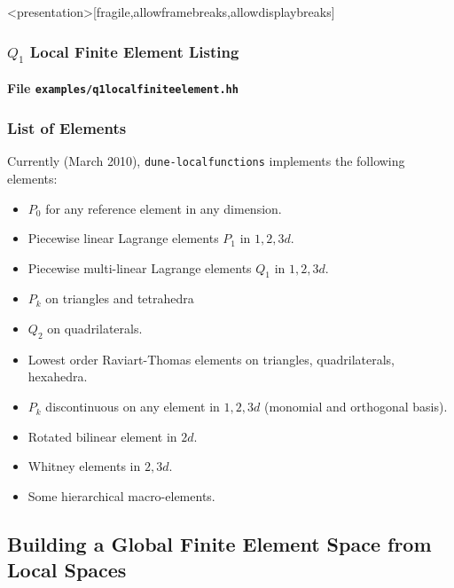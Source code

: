 \begin{frame}<presentation>[fragile,allowframebreaks,allowdisplaybreaks]
\frametitle<presentation>{$Q_1$ Local Finite Element Listing}
\framesubtitle<presentation>{File \texttt{examples/q1localfiniteelement.hh}}

\end{frame}

\begin{frame}
\frametitle{List of Elements}
Currently (March 2010), \lstinline{dune-localfunctions} implements the
following elements:
\begin{itemize}
\item $P_0$ for any reference element in any dimension. 
\item Piecewise linear Lagrange elements $P_1$ in $1, 2, 3d$.
\item Piecewise multi-linear Lagrange elements $Q_1$ in $1, 2, 3d$.
\item $P_k$ on triangles and tetrahedra
\item $Q_2$ on quadrilaterals.
\item Lowest order Raviart-Thomas elements on triangles, quadrilaterals, hexahedra.
\item $P_k$ discontinuous on any element in $1, 2, 3d$ (monomial and orthogonal basis).
\item Rotated bilinear element in $2d$.
\item Whitney elements in $2, 3d$.
\item Some hierarchical macro-elements.
\end{itemize}
\end{frame}

\subsection{Building a Global Finite Element Space from Local Spaces}

